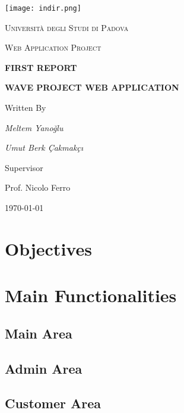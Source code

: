 \documentclass[12pt]{article}
\begin{document}
\begin{titlepage}
	\centering
	\texttt{[image: indir.png]}\par\vspace{1cm}
	{\scshape\large Università degli Studi di Padova \par}
	\vspace{1cm}
	{\scshape\normalsize Web Application Project\par}
	\vspace{1cm}
	    {\Large\bfseries FIRST REPORT
     \par}
     \vspace{1cm}
	{\Large\bfseries  WAVE PROJECT WEB APPLICATION
\par}
	\vspace{1cm}
	{\large {Written By}\par}
	\vspace{1cm}
	{\large\itshape Meltem Yanoğlu\par}
	{\large\itshape Umut Berk Çakmakçı\par}
	\vfill
	Supervisor\par
	Prof. Nicolo Ferro

	\vfill

{\large \today\par}
\end{titlepage}
\small\tableofcontents
\newpage

\section{Objectives}
\bigskip
\paragraph{} 


\section{Main Functionalities}
\bigskip
\paragraph{} 
\subsection{Main Area}
\subsection{Admin Area}
\subsection{Customer Area}
\end{document}
